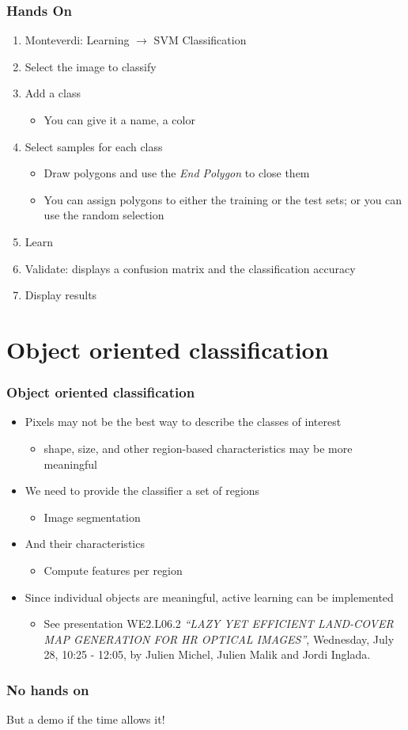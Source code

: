 \documentclass[compress]{beamer}
\begin{document}
\begin{frame}
  \frametitle{Hands On}
  \begin{enumerate}
  \item Monteverdi: Learning $\rightarrow$ SVM Classification
  \item Select the image to classify
  \item Add a class
    \begin{itemize}
    \item You can give it a name, a color
    \end{itemize}
  \item Select samples for each class
    \begin{itemize}
    \item Draw polygons and use the {\em End Polygon} to close them
    \item You can assign polygons to either the training or the test
      sets; or you can use the random selection
    \end{itemize}
  \item Learn
  \item Validate: displays a confusion matrix and the classification accuracy
  \item Display results
  \end{enumerate}    
\end{frame}

\section[Object oriented]{Object oriented classification}
\label{sec:objectoriented}
\begin{frame}
  \frametitle{Object oriented classification}
  \begin{itemize}
  \item Pixels may not be the best way to describe the classes of interest
    \begin{itemize}
    \item shape, size, and other region-based characteristics may be
      more meaningful
    \end{itemize}
  \item We need to provide the classifier a set of regions
    \begin{itemize}
    \item Image segmentation
    \end{itemize}
  \item And their characteristics
    \begin{itemize}
    \item Compute features per region 
    \end{itemize}
  \item Since individual objects are meaningful, active learning can
    be implemented
    \begin{itemize}
    \item See presentation WE2.L06.2 {\em ``LAZY YET EFFICIENT LAND-COVER
      MAP GENERATION FOR HR OPTICAL IMAGES''}, Wednesday, July 28, 10:25
    - 12:05, by Julien Michel, Julien Malik and Jordi Inglada.
    \end{itemize}
  \end{itemize}
\end{frame}

\begin{frame}
  \frametitle{No hands on}
But a demo if the time allows it!
\end{frame}
\end{document}
